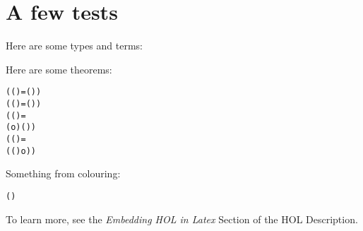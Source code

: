 \documentclass[12pt]{article}
\begin{document}
\section*{A few tests}

Here are some types and terms:
\begin{alltt}\small
  \HOLinline{(:\ensuremath{\alpha})}
\end{alltt}

Here are some theorems:
\begin{alltt}\small
  \HOLTokenTurnstile{} (  (  ) =   (  )) \HOLTokenImp{}
   ( (   )  =  (   ) )
  \HOLTokenTurnstile{}     \HOLTokenConj{}    \HOLTokenConj{}
   (  (  ) =
     ( o ) (  )) \HOLTokenImp{}
   ( (   )  =
     (   (  ) o ) )
\end{alltt}

Something from colouring:
\begin{alltt}\small
  \HOLTokenTurnstile{}   \HOLTokenImp{}
     (  ) \HOLTokenImp{}
      
\end{alltt}

To learn more, see the \emph{Embedding HOL in Latex}
Section of the HOL Description.
\end{document}
